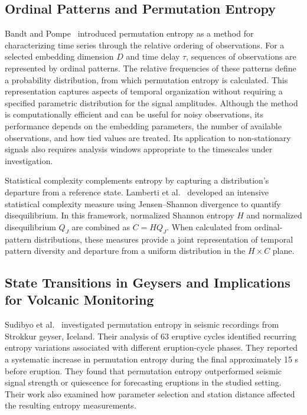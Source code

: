\documentclass[11pt,a4paper]{article}
\begin{document}
\subsection{Ordinal Patterns and Permutation Entropy}

Bandt and Pompe~\cite{Bandt2002} introduced permutation entropy as a method for characterizing time series through the relative ordering of observations. For a selected embedding dimension $D$ and time delay $\tau$, sequences of observations are represented by ordinal patterns. The relative frequencies of these patterns define a probability distribution, from which permutation entropy is calculated. This representation captures aspects of temporal organization without requiring a specified parametric distribution for the signal amplitudes. Although the method is computationally efficient and can be useful for noisy observations, its performance depends on the embedding parameters, the number of available observations, and how tied values are treated. Its application to non-stationary signals also requires analysis windows appropriate to the timescales under investigation.

Statistical complexity complements entropy by capturing a distribution's departure from a reference state. Lamberti et al.~\cite{lamberti2004intensive} developed an intensive statistical complexity measure using Jensen--Shannon divergence to quantify disequilibrium. In this framework, normalized Shannon entropy $H$ and normalized disequilibrium $Q_J$ are combined as $C=H Q_J$. When calculated from ordinal-pattern distributions, these measures provide a joint representation of temporal pattern diversity and departure from a uniform distribution in the $H \times C$ plane.

\subsection{State Transitions in Geysers and Implications for Volcanic Monitoring}

Sudibyo et al.~\cite{Sudibyo2022} investigated permutation entropy in seismic recordings from Strokkur geyser, Iceland. Their analysis of 63 eruptive cycles identified recurring entropy variations associated with different eruption-cycle phases. They reported a systematic increase in permutation entropy during the final approximately 15 s before eruption. They found that permutation entropy outperformed seismic signal strength or quiescence for forecasting eruptions in the studied setting. Their work also examined how parameter selection and station distance affected the resulting entropy measurements.
\end{document}
